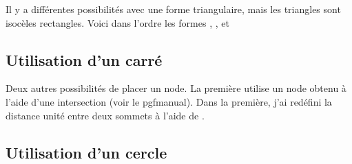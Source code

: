 Il y a différentes possibilités avec une forme triangulaire, mais les triangles sont isocèles rectangles. Voici dans l'ordre les formes ,  ,  et 


\begin{tkzexample}[latex=8cm,small]  
\hspace*{2cm}
\end{tkzexample}

\begin{tkzexample}[latex=8cm,small]  
\hspace*{2cm}
\end{tkzexample}  


\subsection{Utilisation d'un carré}

 
Deux autres possibilités de placer un node. La première utilise un node obtenu à l'aide d'une intersection (voir le pgfmanual). Dans la première, j'ai redéfini la distance unité entre deux sommets à l'aide de   .

\begin{center}
\begin{tkzexample}[latex=7cm,small]
\end{tkzexample}
\end{center}


\subsection{Utilisation d'un cercle }

